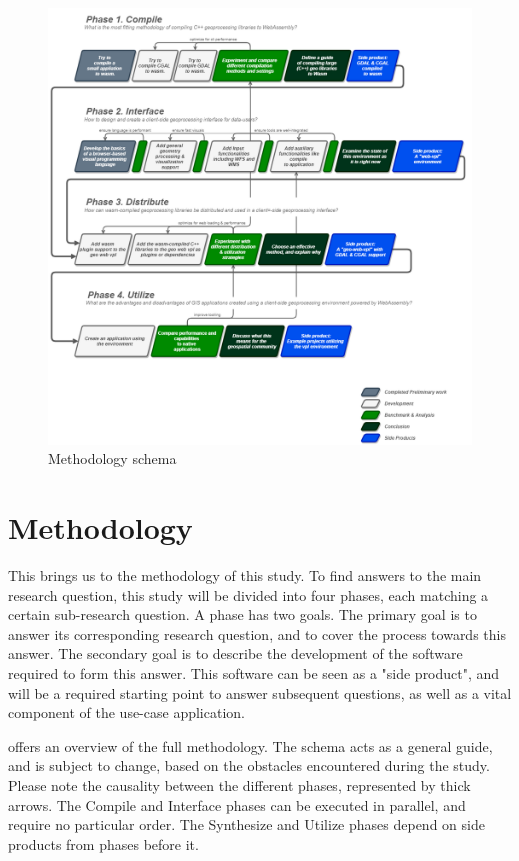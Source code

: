 
\begin{figure}
    \centering
    \graphicspath{ {../schemas/methodology/} }
    \includegraphics[width=14cm]{method.png}
    \caption{Methodology schema}
    \label{fig:method}
\end{figure}

\section{Methodology}

This brings us to the methodology of this study. To find answers to the main research question, this study will be divided into four phases, each matching a certain sub-research question. A phase has two goals. The primary goal is to answer its corresponding research question, and to cover the process towards this answer. The secondary goal is to describe the development of the software required to form this answer. This software can be seen as a "side product", and will be a required starting point to answer subsequent questions, as well as a vital component of the use-case application. 

 offers an overview of the full methodology. The schema acts as a general guide, and is subject to change, based on the obstacles encountered during the study. Please note the causality between the different phases, represented by thick arrows. The Compile and Interface phases can be executed in parallel, and require no particular order. The Synthesize and Utilize phases depend on side products from phases before it. 

